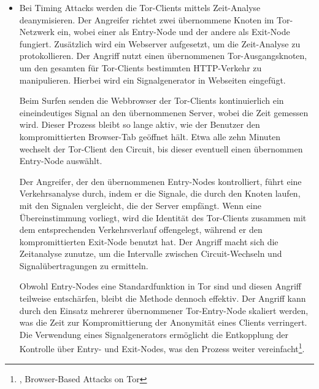 \begin{itemize}
    \item Bei Timing Attacks werden die Tor-Clients mittels Zeit-Analyse deanymisieren. Der Angreifer richtet zwei übernommene Knoten im Tor-Netzwerk ein, wobei einer als Entry-Node und der andere als Exit-Node fungiert. Zusätzlich wird ein Webserver aufgesetzt, um die Zeit-Analyse zu protokollieren. Der Angriff nutzt einen übernommenen Tor-Ausgangsknoten, um den gesamten für Tor-Clients bestimmten HTTP-Verkehr zu manipulieren. Hierbei wird ein Signalgenerator in Webseiten eingefügt.

    Beim Surfen senden die Webbrowser der Tor-Clients kontinuierlich ein eineindeutiges Signal an den übernommenen Server, wobei die Zeit gemessen wird. Dieser Prozess bleibt so lange aktiv, wie der Benutzer den kompromittierten Browser-Tab geöffnet hält. Etwa alle zehn Minuten wechselt der Tor-Client den Circuit, bis dieser eventuell einen übernommen Entry-Node auswählt.

    Der Angreifer, der den übernommenen Entry-Nodes kontrolliert, führt eine Verkehrsanalyse durch, indem er die Signale, die durch den Knoten laufen, mit den Signalen vergleicht, die der Server empfängt. Wenn eine Übereinstimmung vorliegt, wird die Identität des Tor-Clients zusammen mit dem entsprechenden Verkehrsverlauf offengelegt, während er den kompromittierten Exit-Node benutzt hat. Der Angriff macht sich die Zeitanalyse zunutze, um die Intervalle zwischen Circuit-Wechseln und Signalübertragungen zu ermitteln.

    Obwohl Entry-Nodes eine Standardfunktion in Tor sind und diesen Angriff teilweise entschärfen, bleibt die Methode dennoch effektiv. Der Angriff kann durch den Einsatz mehrerer übernommener Tor-Entry-Node skaliert werden, was die Zeit zur Kompromittierung der Anonymität eines Clients verringert. Die Verwendung eines Signalgenerators ermöglicht die Entkopplung der Kontrolle über Entry- und Exit-Nodes, was den Prozess weiter vereinfacht\footnote{\cite{BrowserBasedAttacksOnTor}, Browser-Based Attacks on Tor}.
\end{itemize}
